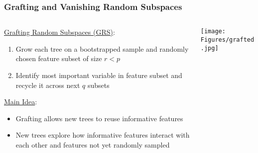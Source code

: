 \documentclass{beamer}
\begin{document}
\begin{frame}

    \frametitle{Grafting and Vanishing Random Subspaces}
    
    \begin{columns}
    
    \begin{column}{0.75\textwidth}
    \small
        \underline{Grafting Random Subspaces (GRS)}:
        \medskip
        \begin{enumerate}
            \item Grow each tree on a bootstrapped sample and randomly chosen feature 
                subset of size $r<p$
            \item Identify most important variable in feature subset and 
                  recycle it across next $q$ subsets
        \end{enumerate}
        \medskip
        \underline{Main Idea}:
        \begin{itemize}
            \item Grafting allows new trees to reuse informative features 
            \item New trees explore how informative features
                interact with each other and features not yet
                randomly sampled
        \end{itemize}
        \end{column}
        
        \begin{column}{0.25\textwidth}
            \begin{center}
                \texttt{[image: Figures/grafted.jpg]}
            \end{center}
        \end{column}
    \end{columns}

\end{frame}


\end{document}
